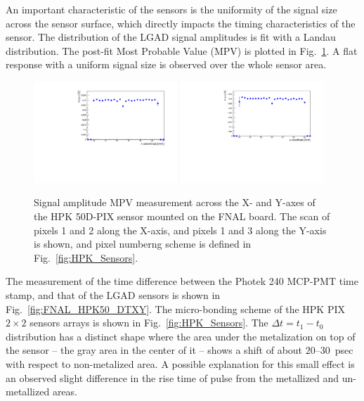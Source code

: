 \documentclass[preprint,1p]{elsarticle}
\begin{document}
An important characteristic of the sensors is the uniformity of the signal size
across the sensor surface, which directly impacts the timing characteristics of
the sensor. The distribution of the LGAD signal amplitudes is fit with a Landau
distribution. The post-fit Most Probable Value (MPV) is
plotted in Fig.~\ref{fig:FNAL_HPK50_MPVXY}. A flat response with a uniform
signal size is observed over the whole sensor area.

\begin{figure}[htbp] 
\centering
\includegraphics[width=0.48\textwidth]{figs/FNALBoard_HPK50DPix_Run847-891/MPV_vs_X_Ch4_5.pdf} 
\includegraphics[width=0.48\textwidth]{figs/FNALBoard_HPK50DPix_Run847-891/MPV_vs_Y_Ch3_4.pdf} 
\caption{Signal amplitude MPV measurement across the X- and Y-axes of the HPK 50D-PIX sensor mounted on the FNAL board. The scan of pixels 1 and 2 along the X-axis, and pixels 1 and 3 along the Y-axis is shown, and pixel numberng scheme is defined in Fig.~\ref{fig:HPK_Sensors}.} 
\label{fig:FNAL_HPK50_MPVXY} 
\end{figure} 



The measurement of the time difference between the Photek 240 MCP-PMT time
stamp, and that of the LGAD sensors is shown in Fig.~\ref{fig:FNAL_HPK50_DTXY}.
The micro-bonding scheme of the HPK PIX $2\times 2$ sensors arrays is shown in
Fig.~\ref{fig:HPK_Sensors}. The $\Delta t = t_{1}-t_{0}$ distribution has a
distinct shape where the area under the metalization on top of the sensor -- the
gray area in the center of it -- shows a shift of about $20$--$30$~psec with
respect to non-metalized area. A possible explanation for this small effect is
an observed slight difference in the rise time of pulse from the metallized and
un-metallized areas. 
\end{document}
